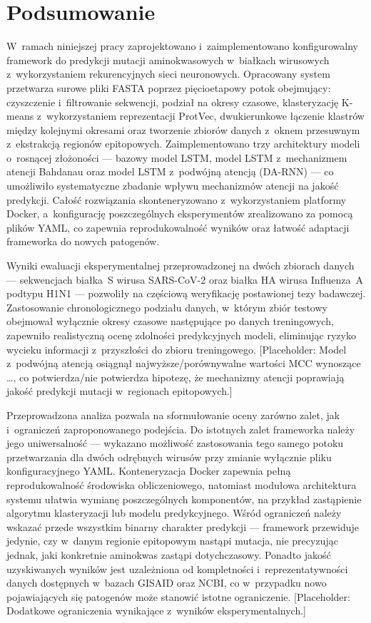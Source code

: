\newpage
\section{Podsumowanie}

W~ramach niniejszej pracy zaprojektowano i~zaimplementowano konfigurowalny framework do predykcji mutacji aminokwasowych w~białkach wirusowych z~wykorzystaniem rekurencyjnych sieci neuronowych. Opracowany system przetwarza surowe pliki FASTA poprzez pięcioetapowy potok obejmujący: czyszczenie i~filtrowanie sekwencji, podział na okresy czasowe, klasteryzację K-means z~wykorzystaniem reprezentacji ProtVec, dwukierunkowe łączenie klastrów między kolejnymi okresami oraz tworzenie zbiorów danych z~oknem przesuwnym z~ekstrakcją regionów epitopowych. Zaimplementowano trzy architektury modeli o~rosnącej złożoności --- bazowy model LSTM, model LSTM z~mechanizmem atencji Bahdanau oraz model LSTM z~podwójną atencją (DA-RNN) --- co umożliwiło systematyczne zbadanie wpływu mechanizmów atencji na jakość predykcji. Całość rozwiązania skonteneryzowano z~wykorzystaniem platformy Docker, a~konfigurację poszczególnych eksperymentów zrealizowano za pomocą plików YAML, co zapewnia reprodukowalność wyników oraz łatwość adaptacji frameworka do nowych patogenów.

Wyniki ewaluacji eksperymentalnej przeprowadzonej na dwóch zbiorach danych --- sekwencjach białka~S wirusa SARS-CoV-2 oraz białka HA wirusa Influenza~A podtypu H1N1 --- pozwoliły na częściową weryfikację postawionej tezy badawczej. Zastosowanie chronologicznego podziału danych, w~którym zbiór testowy obejmował wyłącznie okresy czasowe następujące po danych treningowych, zapewniło realistyczną ocenę zdolności predykcyjnych modeli, eliminując ryzyko wycieku informacji z~przyszłości do zbioru treningowego. [Placeholder: Model z~podwójną atencją osiągnął najwyższe/porównywalne wartości MCC wynoszące \ldots, co potwierdza/nie potwierdza hipotezę, że mechanizmy atencji poprawiają jakość predykcji mutacji w~regionach epitopowych.]

Przeprowadzona analiza pozwala na sformułowanie oceny zarówno zalet, jak i~ograniczeń zaproponowanego podejścia. Do istotnych zalet frameworka należy jego uniwersalność --- wykazano możliwość zastosowania tego samego potoku przetwarzania dla dwóch odrębnych wirusów przy zmianie wyłącznie pliku konfiguracyjnego YAML. Konteneryzacja Docker zapewnia pełną reprodukowalność środowiska obliczeniowego, natomiast modułowa architektura systemu ułatwia wymianę poszczególnych komponentów, na przykład zastąpienie algorytmu klasteryzacji lub modelu predykcyjnego. Wśród ograniczeń należy wskazać przede wszystkim binarny charakter predykcji --- framework przewiduje jedynie, czy w~danym regionie epitopowym nastąpi mutacja, nie precyzując jednak, jaki konkretnie aminokwas zastąpi dotychczasowy. Ponadto jakość uzyskiwanych wyników jest uzależniona od kompletności i~reprezentatywności danych dostępnych w~bazach GISAID oraz NCBI, co w~przypadku nowo pojawiających się patogenów może stanowić istotne ograniczenie. [Placeholder: Dodatkowe ograniczenia wynikające z~wyników eksperymentalnych.]

